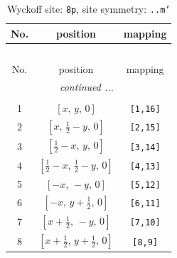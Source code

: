 \documentclass[fleqn,8pt]{jsarticle}
\begin{document}
\begin{longtable}{ccc}
\caption{Wyckoff site: {\tt 8p}, site symmetry: {\tt ..m'}}
 \\
 \hline \hline
No. & position & mapping \\ \hline \endfirsthead

\multicolumn{2}{l}{\tablename\ \thetable{}} \\
 \hline \hline
No. & position & mapping \\ \hline \endhead

 \hline \hline
\multicolumn{2}{r}{\footnotesize\it continued ...} \\ \endfoot

 \hline \hline
\multicolumn{2}{r}{} \\ \endlastfoot

1 & $\left[ x,\, y,\, 0 \right]$ & {\tt [1,16]} \\ \hline
2 & $\left[ x,\, \frac{1}{2} - y,\, 0 \right]$ & {\tt [2,15]} \\ \hline
3 & $\left[ \frac{1}{2} - x,\, y,\, 0 \right]$ & {\tt [3,14]} \\ \hline
4 & $\left[ \frac{1}{2} - x,\, \frac{1}{2} - y,\, 0 \right]$ & {\tt [4,13]} \\ \hline
5 & $\left[ - x,\, - y,\, 0 \right]$ & {\tt [5,12]} \\ \hline
6 & $\left[ - x,\, y + \frac{1}{2},\, 0 \right]$ & {\tt [6,11]} \\ \hline
7 & $\left[ x + \frac{1}{2},\, - y,\, 0 \right]$ & {\tt [7,10]} \\ \hline
8 & $\left[ x + \frac{1}{2},\, y + \frac{1}{2},\, 0 \right]$ & {\tt [8,9]} \\
\end{longtable}
\renewcommand{\arraystretch}{1.2}
\end{document}
